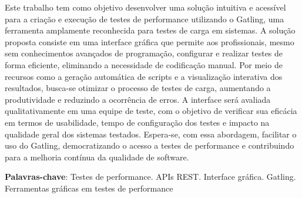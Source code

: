 \documentclass[
	12pt,
	openright,
	twoside,
	a4paper,
	english,
	brazil
	]{abntex2}
\begin{document}
\frenchspacing


\imprimircapa


\imprimirfolhaderosto*


\setlength{\absparsep}{18pt}
\begin{resumo}
  Este trabalho tem como objetivo desenvolver uma solução intuitiva e acessível para a criação e execução de testes de performance utilizando o Gatling, uma ferramenta amplamente reconhecida para testes de carga em sistemas. A solução proposta consiste em uma interface gráfica que permite aos profissionais, mesmo sem conhecimentos avançados de programação, configurar e realizar testes de forma eficiente, eliminando a necessidade de codificação manual. Por meio de recursos como a geração automática de scripts e a visualização interativa dos resultados, busca-se otimizar o processo de testes de carga, aumentando a produtividade e reduzindo a ocorrência de erros. A interface será avaliada qualitativamente em uma equipe de teste, com o objetivo de verificar sua eficácia em termos de usabilidade, tempo de configuração dos testes e impacto na qualidade geral dos sistemas testados. Espera-se, com essa abordagem, facilitar o uso do Gatling, democratizando o acesso a testes de performance e contribuindo para a melhoria contínua da qualidade de software.
  \vspace{\onelineskip}

  \noindent\textbf{Palavras-chave}: Testes de performance. APIs REST. Interface gráfica. Gatling. Ferramentas gráficas em testes de performance
\end{resumo}

\end{document}
